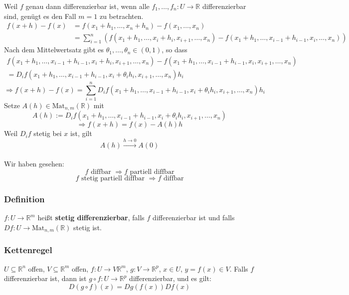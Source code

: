 Weil $f$ genau dann differenzierbar ist, wenn alle $f_1 , \dots , f_n: U \to \mathbb{R} $ differenzierbar sind, genügt es den Fall $m=1$ zu betrachten.
\begin{align*}
	f(x+h) - f(x) &= f(x_1+h_1, \dots ,x_n+h_n) - f(x_1, \dots, x_n) \\
	&= \sum^{n}_{i=1} \left( f(x_1+h_1, \dots,x_i+h_i,x_{i+1} ,\dots,x_n) - f(x_1+h_1, \dots,x_{i-1}+h_{i-1},x_{i} ,\dots,x_n) \right)
\end{align*}
Nach dem Mittelwertsatz gibt es $\theta_1, \dots , \theta_n \in (0,1)$, so dass
\begin{gather*}
	f(x_1+h_1, \dots,x_{i-1}+h_{i-1},x_i+h_i,x_{i+1} ,\dots,x_n) - f(x_1+h_1, \dots,x_{i-1}+h_{i-1},x_i,x_{i+1} ,\dots,x_n) \\
	= D_if(x_1+h_1, \dots,x_{i-1}+h_{i-1},x_{i}+\theta_ih_i,x_{i+1} ,\dots,x_n)h_i 
\end{gather*}
\[
	\Rightarrow f(x+h)-f(x)= \sum^{n}_{i=1}D_if(x_1+h_1, \dots,x_{i-1}+h_{i-1},x_{i}+\theta_ih_i,x_{i+1} ,\dots,x_n)h_i 
\]
Setze $A(h) \in \text{Mat}_{n,m}(\mathbb{R})$ mit
\[
	A(h):= D_if(x_1+h_1, \dots,x_{i-1}+h_{i-1},x_{i}+\theta_ih_i,x_{i+1} ,\dots,x_n)
\]
\[
	\Rightarrow f(x+h)=f(x)-A(h)h
\]
Weil $D_if$ stetig bei $x$ ist, gilt
\[
	A(h) \stackrel{h \to 0}{\longrightarrow} A(0)
\]
\bewende \\
Wir haben gesehen: 
\[
	f \text{ diffbar } \Rightarrow f \text{ partiell diffbar}
\]
\[
	f \text{ stetig partiell diffbar } \Rightarrow f \text{ diffbar}
\]
\subsubsection{Definition} %
\label{ssub:definition}
$f: U \to \mathbb{R}^m$ heißt {\bfseries stetig differenzierbar}, falls $f$ differenzierbar ist und falls $Df: U \to \text{Mat}_{n,m}(\mathbb{R})$ stetig ist.

\subsubsection{Kettenregel} %
\label{ssub:kettenregel}
$U \subseteq \mathbb{R}^n$ offen, $V \subseteq \mathbb{R}^m$ offen, $f:U \to V \mathbb{R}^m$, $g: V \to \mathbb{R}^p$, $x \in U$, $y=f(x) \in V$. Falls $f$ 
differenzierbar ist, dann ist $g \circ f: U \to \mathbb{R}^p$ differenzierbar, und es gilt:
\[
	D(g \circ f)(x) = Dg(f(x))Df(x)
\]

